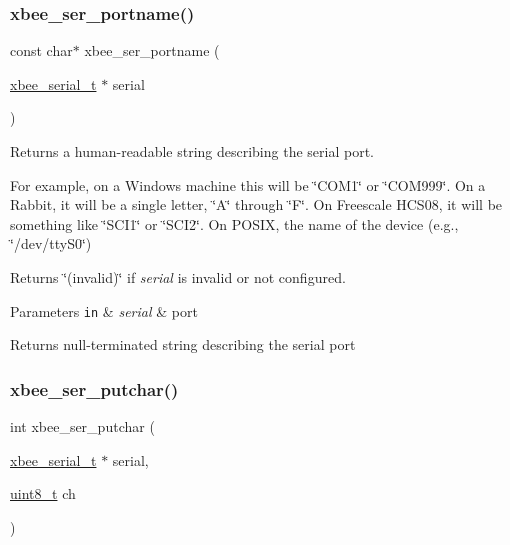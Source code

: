 \subsubsection{\texorpdfstring{xbee\+\_\+ser\+\_\+portname()}{xbee\_ser\_portname()}}
{\footnotesize\ttfamily const char$\ast$ xbee\+\_\+ser\+\_\+portname (\begin{DoxyParamCaption}\item[{\hyperlink{structxbee__serial__t}{xbee\+\_\+serial\+\_\+t} $\ast$}]{serial }\end{DoxyParamCaption})}



Returns a human-\/readable string describing the serial port. 

For example, on a Windows machine this will be \char`\"{}\+C\+O\+M1\char`\"{} or \char`\"{}\+C\+O\+M999\char`\"{}. On a Rabbit, it will be a single letter, \char`\"{}\+A\char`\"{} through \char`\"{}\+F\char`\"{}. On Freescale H\+C\+S08, it will be something like \char`\"{}\+S\+C\+I1\char`\"{} or \char`\"{}\+S\+C\+I2\char`\"{}. On P\+O\+S\+IX, the name of the device (e.\+g., \char`\"{}/dev/tty\+S0\char`\"{})

Returns \char`\"{}(invalid)\char`\"{} if {\itshape serial} is invalid or not configured.


\begin{DoxyParams}[1]{Parameters}
\mbox{\tt in}  & {\em serial} & port\\
\hline
\end{DoxyParams}
\begin{DoxyReturn}{Returns}
null-\/terminated string describing the serial port 
\end{DoxyReturn}
\mbox{\label{group__hal__rabbit_ga86fea2345efb8bf9424228f0979b1849}} 
\subsubsection{\texorpdfstring{xbee\+\_\+ser\+\_\+putchar()}{xbee\_ser\_putchar()}}
{\footnotesize\ttfamily int xbee\+\_\+ser\+\_\+putchar (\begin{DoxyParamCaption}\item[{\hyperlink{structxbee__serial__t}{xbee\+\_\+serial\+\_\+t} $\ast$}]{serial,  }\item[{\hyperlink{group__hal__dos_gae1affc9ca37cfb624959c866a73f83c2}{uint8\+\_\+t}}]{ch }\end{DoxyParamCaption})}



